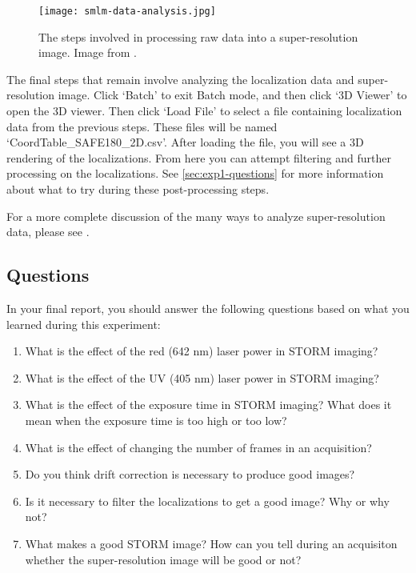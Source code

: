 \documentclass[10pt,a4paper,oneside]{book}
\begin{document}
\begin{figure}
    \centering
    \texttt{[image: smlm-data-analysis.jpg]}
    \caption{The steps involved in processing raw data into a super-resolution image. Image from \cite{martens-frontiersinbioinformatics-2022}.}
    \label{fig:smlm-data-analysis}
\end{figure}

The final steps that remain involve analyzing the localization data and super-resolution image. Click `Batch' to exit Batch mode, and then click `3D Viewer' to open the 3D viewer. Then click `Load File' to select a file containing localization data from the previous steps. These files will be named `CoordTable_SAFE180_2D.csv'. After loading the file, you will see a 3D rendering of the localizations. From here you can attempt filtering and further processing on the localizations. See \autoref{sec:exp1-questions} for more information about what to try during these post-processing steps.

For a more complete discussion of the many ways to analyze super-resolution data, please see \cite{martens-frontiersinbioinformatics-2022}.

\subsection{Questions}\label{sec:exp1-questions}

In your final report, you should answer the following questions based on what you learned during this experiment:

\begin{enumerate}
    \item{What is the effect of the red (642 nm) laser power in STORM imaging?}
    \item{What is the effect of the UV (405 nm) laser power in STORM imaging?}
    \item{What is the effect of the exposure time in STORM imaging? What does it mean when the exposure time is too high or too low?}
    \item{What is the effect of changing the number of frames in an acquisition?}
    \item{Do you think drift correction is necessary to produce good images?}
    \item{Is it necessary to filter the localizations to get a good image? Why or why not?}
    \item{What makes a good STORM image? How can you tell during an acquisiton whether the super-resolution image will be good or not?}
\end{enumerate}
\end{document}
